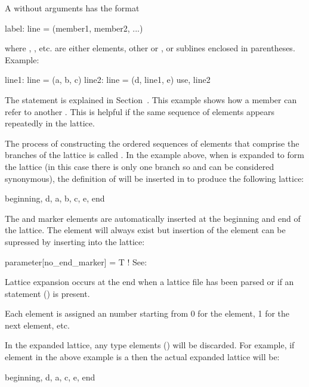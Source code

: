 A  without arguments has the format
\begin{example}
  label: line = (member1, member2, ...)
\end{example}
where , , etc. are either elements, other  or , or sublines enclosed in parentheses.
Example:
\begin{example}
  line1: line = (a, b, c)
  line2: line = (d, line1, e)
  use, line2
\end{example}
The  statement is explained in Section~.
This example shows how a  member can refer to another
. This is helpful if the same sequence of elements
appears repeatedly in the lattice. 

The process of constructing the ordered sequences of elements that
comprise the branches of the lattice is called . In the example above, when  is expanded to form
the lattice (in this case there is only one branch so  and
 can be considered synonymous), the definition of
 will be inserted in to produce the following lattice:
\begin{example}
  beginning, d, a, b, c, e, end
\end{example}
The  and  marker elements are automatically inserted
at the beginning and end of the lattice. The  element will
always exist but insertion of the  element can be supressed by inserting
into the lattice:
\begin{example}
 parameter[no_end_marker] = T    ! See: 
\end{example}
Lattice expansion occurs at the end when a lattice file has been
parsed or if an  statement () is
present.

Each element is assigned an  number starting from 0
for the  element, 1 for the next element, etc.

In the expanded lattice, any  type elements
() will be discarded. For example, if element 
in the above example is a  then the actual expanded
lattice will be:
\begin{example}
  beginning, d, a, c, e, end
\end{example}

